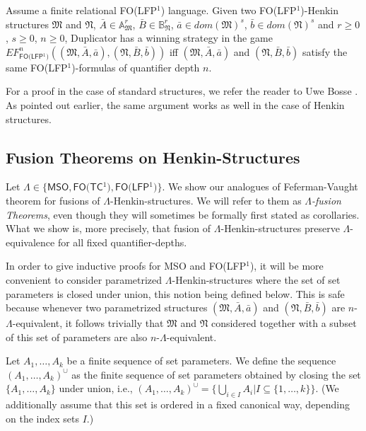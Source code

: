 \documentclass{LMCS}
\newcommand{\frM}{\mathfrak{M}}
\newcommand{\frN}{\mathfrak{N}}
\newcommand{\mso}{\textsf{MSO}\xspace}
\newcommand{\fotc}{\textsf{FO(TC$^1$)}\xspace}
\newcommand{\folfp}{\textsf{FO(LFP$^1$)}\xspace}
\begin{document}
\begin{thm}[\folfp Adequacy]\label{thm:effolfp}
  Assume a finite relational \folfp language. Given two \folfp-Henkin
  structures $\frM$ and $\frN$, $\bar{A} \in \mathbb{A}_{\frM}^r$,
  $\bar{B} \in \mathbb{B}_{\frN}^r$, $\bar{a} \in dom(\frM)^s$,
  $\bar{b} \in dom(\frN)^s$ and $r \geq 0$, $s \geq 0$, $n \geq 0$,
  Duplicator has a winning strategy in the game $EF_\folfp^n((\frM,
  \bar{A}, \bar{a}), (\frN, \bar{B}, \bar{b}))$ iff $(\frM, \bar{A},
  \bar{a})$ and $(\frN, \bar{B}, \bar{b})$ satisfy the same
  \folfp-for\-mulas of quantifier depth $n$.
\end{thm}
For a proof in the case of standard structures, we refer the reader to Uwe Bosse \cite{736408}. As pointed out earlier, the same argument works as well in the case of Henkin structures.



\subsection{Fusion Theorems on Henkin-Structures}
\label{apc}


Let $\Lambda \in \{\mso,\fotc,\folfp\}$. We show our analogues of Feferman-Vaught theorem for fusions of $\Lambda$-Henkin-structures. We will refer to them as \emph{$\Lambda$-fusion Theorems}, even though they will sometimes be formally first stated as corollaries. What we show is, more precisely, that fusion of $\Lambda$-Henkin-structures preserve $\Lambda$-equivalence for all fixed quantifier-depths.

In order to give inductive proofs for \mso and \folfp, it will be more convenient to consider parametrized $\Lambda$-Henkin-structures where the set of set parameters is closed under union, this notion being defined below. This is safe because whenever two parametrized structures $(\frM,\bar{A},\bar{a})$ and $(\frN,\bar{B},\bar{b})$ are $n$-$\Lambda$-equivalent, it follows trivially that $\frM$ and $\frN$ considered together with a subset of this set of parameters are also $n$-$\Lambda$-equivalent.


\begin{defi}
Let $A_1, \ldots, A_k$ be a finite sequence of set parameters. We
define the sequence $(A_1, \ldots, A_k)^\cup$ as the finite sequence of set
parameters obtained by closing the set $\{A_1, \ldots, A_k\}$
under union, i.e., $(A_1, \ldots, A_k)^\cup=\{\bigcup_{i \in I}
A_i | I \subseteq \{1,\ldots,k\}\}$. (We additionally assume that
this set is ordered in a fixed canonical way, depending on the
index sets $I$.)
\end{defi}
\end{document}
